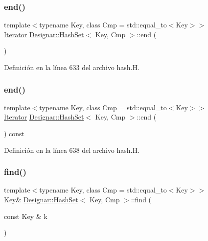 \subsubsection{\texorpdfstring{end()}{end()}\hspace{0.1cm}{\footnotesize\ttfamily [1/2]}}
{\footnotesize\ttfamily template$<$typename Key, class Cmp = std\+::equal\+\_\+to$<$\+Key$>$$>$ \\
\hyperlink{class_designar_1_1_hash_set_1_1_iterator}{Iterator} \hyperlink{class_designar_1_1_hash_set}{Designar\+::\+Hash\+Set}$<$ Key, Cmp $>$\+::end (\begin{DoxyParamCaption}{ }\end{DoxyParamCaption})\hspace{0.3cm}{\ttfamily [inline]}}



Definición en la línea 633 del archivo hash.\+H.

\mbox{\label{class_designar_1_1_hash_set_ae136c18f4602ec2053a4c73b8c5c5946}} 
\subsubsection{\texorpdfstring{end()}{end()}\hspace{0.1cm}{\footnotesize\ttfamily [2/2]}}
{\footnotesize\ttfamily template$<$typename Key, class Cmp = std\+::equal\+\_\+to$<$\+Key$>$$>$ \\
\hyperlink{class_designar_1_1_hash_set_1_1_iterator}{Iterator} \hyperlink{class_designar_1_1_hash_set}{Designar\+::\+Hash\+Set}$<$ Key, Cmp $>$\+::end (\begin{DoxyParamCaption}{ }\end{DoxyParamCaption}) const\hspace{0.3cm}{\ttfamily [inline]}}



Definición en la línea 638 del archivo hash.\+H.

\mbox{\label{class_designar_1_1_hash_set_a96df362356788b6f3f1261a526a1fd82}} 
\subsubsection{\texorpdfstring{find()}{find()}\hspace{0.1cm}{\footnotesize\ttfamily [1/2]}}
{\footnotesize\ttfamily template$<$typename Key, class Cmp = std\+::equal\+\_\+to$<$\+Key$>$$>$ \\
Key\& \hyperlink{class_designar_1_1_hash_set}{Designar\+::\+Hash\+Set}$<$ Key, Cmp $>$\+::find (\begin{DoxyParamCaption}\item[{const Key \&}]{k }\end{DoxyParamCaption})\hspace{0.3cm}{\ttfamily [inline]}}



